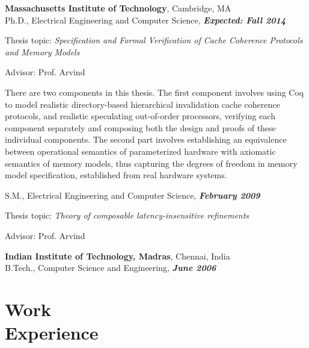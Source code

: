 \documentclass[margin,line]{resume}
\begin{document}
\begin{resume}
    \textbf{Massachusetts Institute of Technology}, Cambridge, MA \\
    \vspace{-2mm}
    Ph.D., Electrical Engineering and Computer Science, \hfill \textbf{\textit{Expected: Fall 2014}}\\
    \vspace{-2mm}
    \begin{list2}
        \item Thesis topic: \textit{Specification and Formal Verification of Cache Coherence Protocols and Memory Models}
        \item Advisor:  Prof. Arvind
        \item There are two components in this thesis. The first component involves using Coq to model
              realistic directory-based hierarchical invalidation cache coherence protocols, and realistic
              speculating out-of-order processors, verifying each component separately and composing both the design
              and proofs of these individual components. The second part involves establishing an equivalence between
              operational semantics of parameterized hardware with axiomatic semantics of memory models, thus capturing
              the degrees of freedom in memory model specification, established from real hardware systems.
    \end{list2}\vspace{-3mm}
    S.M., Electrical Engineering and Computer Science, \hfill \textbf{\textit{February 2009}}\\
    \vspace{-3mm}
    \begin{list2}
        \item Thesis topic: \textit{Theory of composable latency-insensitive refinements}
        \item Advisor:  Prof. Arvind
    \end{list2}\vspace{-3mm}
    \textbf{Indian Institute of Technology, Madras}, Chennai, India\\
    B.Tech., Computer Science and Engineering, \hfill \textbf{\textit{June 2006}}\\
    \vspace{-7mm}


    \section{\mysidestyle Work\\Experience}


\end{resume}
\end{document}
